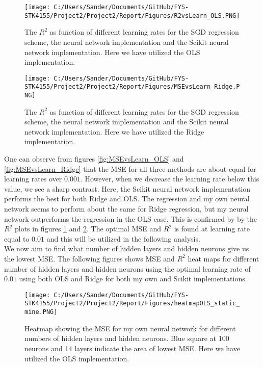 \documentclass[12pt,a4paper]{article}
\begin{document}
\begin{figure}[H]
\centering
\texttt{[image: C:/Users/Sander/Documents/GitHub/FYS-STK4155/Project2/Project2/Report/Figures/R2vsLearn\_OLS.PNG]}
\caption{\label{fig:R2vsLearn_OLS} The $R^2$ as function of different learning rates for the SGD regression scheme, the neural network implementation and the Scikit neural network implementation. Here we have utilized the OLS implementation.}
\end{figure}

\begin{figure}[H]
\centering
\texttt{[image: C:/Users/Sander/Documents/GitHub/FYS-STK4155/Project2/Project2/Report/Figures/MSEvsLearn\_Ridge.PNG]}
\caption{\label{fig:R2vsLearn_Ridge} The $R^2$ as function of different learning rates for the SGD regression scheme, the neural network implementation and the Scikit neural network implementation. Here we have utilized the Ridge implementation.}
\end{figure}

\noindent One can observe from figures \ref{fig:MSEvsLearn_OLS} and \ref{fig:MSEvsLearn_Ridge} that the MSE for all three methods are about equal for learning rates over $0.001$. However, when we decrease the learning rate below this value, we see a sharp contrast. Here, the Scikit neural network implementation performs the best for both Ridge and OLS. The regression and my own neural network seems to perform about the same for Ridge regression, but my neural network outperforms the regression in the OLS case. This is confirmed by by the $R^2$ plots in figures \ref{fig:R2vsLearn_OLS} and \ref{fig:R2vsLearn_Ridge}. The optimal MSE and $R^2$ is found at learning rate equal to $0.01$ and this will be utilized in the following analysis.
\\
We now aim to find what number of hidden layers and hidden neurons give us the lowest MSE. The following figures shows MSE and $R^2$ heat maps for different number of hidden layers and hidden neurons using the optimal learning rate of $0.01$ using both OLS and Ridge for both my own and Scikit implementations.

\begin{figure}[H]
\centering
\texttt{[image: C:/Users/Sander/Documents/GitHub/FYS-STK4155/Project2/Project2/Report/Figures/heatmapOLS\_static\_mine.PNG]}
\caption{\label{fig:heatOLS} Heatmap showing the MSE for my own neural network for different numbers of hidden layers and hidden neurons. Blue square at 100 neurons and 14 layers indicate the area of lowest MSE. Here we have utilized the OLS implementation.}
\end{figure}
\end{document}
